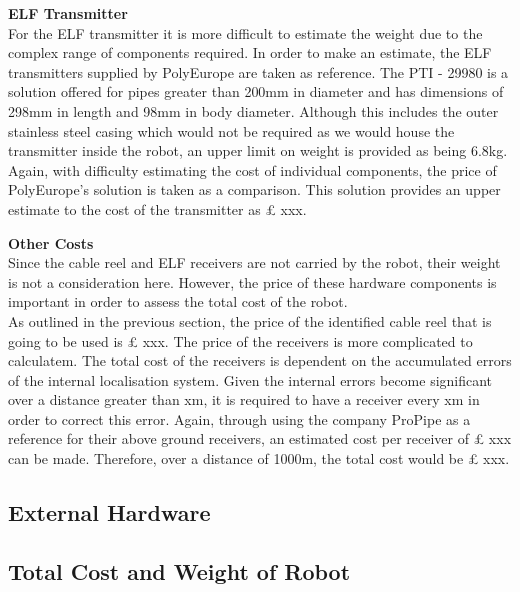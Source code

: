 \documentclass[11pt]{article}		%
\begin{document}
        \textbf{ELF Transmitter}\\
        For the ELF transmitter it is more difficult to estimate the weight due to the complex range of components required. In order to make an estimate, the ELF transmitters supplied by PolyEurope are taken as reference. The PTI - 29980 is a solution offered for pipes greater than 200mm in diameter and has dimensions of 298mm in length and 98mm in body diameter. Although this includes the outer stainless steel casing which would not be required as we would house the transmitter inside the robot, an upper limit on weight is provided as being 6.8kg.\\
        \hspace*{3ex}Again, with difficulty estimating the cost of individual components, the price of PolyEurope’s solution is taken as a comparison. This solution provides an upper estimate to the cost of the transmitter as £ xxx. 
    
        \textbf{Other Costs}\\

        
        Since the cable reel and ELF receivers are not carried by the robot, their weight is not a consideration here. However, the price of these hardware components is important in order to assess the total cost of the robot. \\
	    \hspace*{3ex}As outlined in the previous section, the price of the identified cable reel that is going to be used is £ xxx. The price of the receivers is more complicated to calculatem. The total cost of the receivers is dependent on the accumulated errors of the internal localisation system. Given the internal errors become significant over a distance greater than xm, it is required to have a receiver every xm in order to correct this error. Again, through using the company ProPipe as a reference for their above ground receivers, an estimated cost per receiver of £ xxx can be made. Therefore, over a distance of 1000m, the total cost would be £ xxx. 




		\subsection{External Hardware}
		
		\subsection{Total Cost and Weight of Robot}
			
\end{document}
